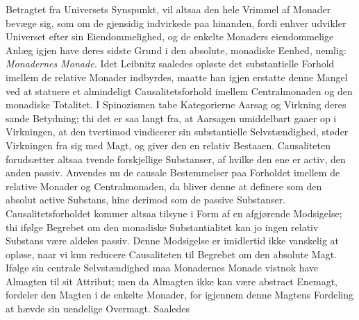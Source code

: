 \documentclass[12pt]{book}
\newcommand{\opage}[1]{\marginnote{\footnotesize\textit{[#1]}}}
\begin{document}
Betragtet fra Universets Synspunkt, vil altsaa den hele Vrimmel af Monader bevæge sig,
som om de gjensidig indvirkede paa hinanden, fordi enhver udvikler Universet efter sin
Eiendommelighed, og de enkelte Monaders eiendommelige Anlæg igjen have deres sidste
Grund i den absolute, monadiske Eenhed, nemlig: \emph{Monadernes Monade.} Idet Leibnitz
saaledes opløste det substantielle Forhold imellem de relative Monader indbyrdes,
maatte han igjen erstatte denne Mangel ved at statuere et almindeligt
Causalitetsforhold imellem Centralmonaden og den monadiske Totalitet.
\opage{171} %
%
I Spinozismen tabe Kategorierne Aarsag og Virkning deres sande Betydning; thi det er
saa langt fra, at Aarsagen umiddelbart gaaer op i Virkningen, at den tvertimod
vindicerer sin substantielle Selvstændighed, støder Virkningen fra sig med Magt, og
giver den en relativ Bestaaen. Causaliteten forudsætter altsaa tvende forskjellige
Substanser, af hvilke den ene er activ, den anden passiv. Anvendes nu de causale
Bestemmelser paa Forholdet imellem de relative Monader og Centralmonaden, da bliver
denne at definere som den absolut active Substans, hine derimod som de passive
Substanser. Causalitetsforholdet kommer altsaa tilsyne i Form af en afgjørende
Modsigelse; thi ifølge Begrebet om den monadiske Substantialitet kan jo ingen relativ
Substans være aldeles passiv. Denne Modsigelse er imidlertid ikke vanskelig at opløse,
naar vi kun reducere Causaliteten til Begrebet om den absolute Magt. Ifølge sin
centrale Selvstændighed maa Monadernes Monade vistnok have Almagten til sit Attribut;
men da Almagten ikke kan være abstract Enemagt, fordeler den Magten i de enkelte
Monader, for igjennem denne Magtens Fordeling at hævde sin uendelige Overmagt. Saaledes
\end{document}
